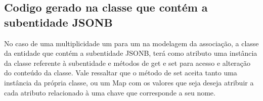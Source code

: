 \subsection{Codigo gerado na classe que contém a subentidade JSONB}
No caso de uma multiplicidade um para um na modelagem da associação, a classe da
entidade que contém a subentidade JSONB, terá como atributo uma instância da
classe referente à subentidade e métodos de get e set para acesso e alteração do
conteúdo da classe. Vale ressaltar que o método de set aceita tanto uma
instância da própria classe, ou um Map com os valores que seja deseja atribuir a
cada atributo relacionado à uma chave que corresponde a seu nome.
